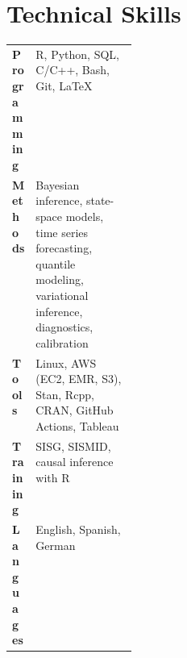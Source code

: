 \documentclass[10pt,letterpaper]{article}
\newcommand{\cvsection}[1]{%
  \Needspace{5\baselineskip}%
  \section*{#1}%
}
\begin{document}
\cvsection{Technical Skills}
\begin{tabularx}{\linewidth}{>{\bfseries}p{0.18\linewidth}X}
Programming & R, Python, SQL, C/C++, Bash, Git, \LaTeX \\
Methods & Bayesian inference, state-space models, time series forecasting, quantile modeling, variational inference, diagnostics, calibration \\
Tools & Linux, AWS (EC2, EMR, S3), Stan, Rcpp, CRAN, GitHub Actions, Tableau \\
Training & SISG, SISMID, causal inference with R \\
Languages & English, Spanish, German \\
\end{tabularx}
\end{document}

